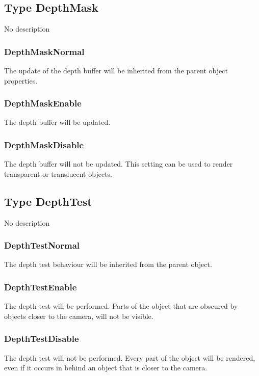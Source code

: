 \documentclass[10pt]{book}
\begin{document}
\subsection{Type DepthMask \label{T:DepthMask}}
No description

\subsubsection{DepthMaskNormal \label{T:DepthMask|DepthMaskNormal}}
The update of the depth buffer will be inherited from the parent object properties.

\subsubsection{DepthMaskEnable \label{T:DepthMask|DepthMaskEnable}}
The depth buffer will be updated.

\subsubsection{DepthMaskDisable \label{T:DepthMask|DepthMaskDisable}}
The depth buffer will not be updated. This setting can be used to render transparent or translucent objects.

\subsection{Type DepthTest \label{T:DepthTest}}
No description

\subsubsection{DepthTestNormal \label{T:DepthTest|DepthTestNormal}}
The depth test behaviour will be inherited from the parent object.

\subsubsection{DepthTestEnable \label{T:DepthTest|DepthTestEnable}}
The depth test will be performed. Parts of the object that are obscured by objects closer to the camera, will not be visible.

\subsubsection{DepthTestDisable \label{T:DepthTest|DepthTestDisable}}
The depth test will not be performed. Every part of the object will be rendered, even if it occurs in behind an object that is closer to the camera.
\end{document}
